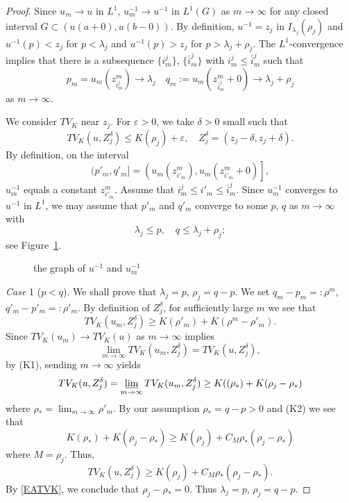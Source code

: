\documentclass[10pt,a4paper]{amsart}
\begin{document}
\begin{proof}
Since $u_m\to u$ in $L^1$, $u_m^{-1}\to u^{-1}$ in $L^1(G)$ as $m\to\infty$ for any closed interval $G \subset\left(u(a+0),u(b-0)\right)$.
 By definition, $u^{-1}=z_j$ in $I_{\lambda_j}(\rho_j)$ and $u^{-1}(p)<z_j$ for $p<\lambda_j$ and $u^{-1}(p)>z_j$ for $p>\lambda_j+\rho_j$.
 The $L^1$-convergence implies that there is a subsequence $\{i_m^j\}$, $\{\bar{i}_m^j\}$ with $i_m^j\le \bar{i}_m^j$ such that
\[
    p_m = u_m(z_{i_m^j}^m) \to \lambda_j \quad
    q_m := u_m(z_{\bar{i}_m^j}^m + 0) \to \lambda_j + \rho_j
\]
as $m\to\infty$.

We consider $TV_K$ near $z_j$.
 For $\varepsilon>0$, we take $\delta>0$ small such that
\begin{equation} \label{EATVK}
    TV_K(u,Z_j^\delta) \le K(\rho_j) + \varepsilon, \quad
    Z_j^\delta = (z_j-\delta, z_j+\delta).
\end{equation}
By definition, on the interval
\[
    (p'_m, q'_m]
    = \left( u_m(z_{i'_m}^m), u_m(z_{i'_m}^m + 0) \right],
\]
$u_m^{-1}$ equals a constant $z_{i'_m}^m$.
 Assume that $i_m^j\le i'_m\le \bar{i}_m^j$.
 Since $u_m^{-1}$ converges to $u^{-1}$ in $L^1$,
 we may assume that $p'_m$ and $q'_m$ converge to some $p$, $q$ as $m\to\infty$ with
\[
    \lambda_j \le p, \quad
    q \le \lambda_j + \rho_j;
\]
see Figure~\ref{FAp}.
\begin{figure}[tb]
\centering 

\caption{the graph of $u^{-1}$ and $u_m^{-1}$\label{FAp}}
\end{figure}

\noindent
\emph{Case} 1 ($p<q$).
 We shall prove that $\lambda_j=p$, $\rho_j=q-p$.
 We set $q_m-p_m=:\rho^m$, $q'_m-p'_m=:\rho'_m$.
 By definition of $Z_j^\delta$, for sufficiently large $m$ we see that
\[
    TV_K(u_m,Z_j^\delta) \ge K(\rho'_m)
    + K(\rho^m -\rho'_m).
\]
Since $TV_K(u_m)\to TV_K(u)$ as $m\to\infty$ implies
\[
    \lim_{m\to\infty} TV_K (u_m,Z_j^\delta)
    = TV_K (u,Z_j^\delta),
\]
by (K1), sending $m\to\infty$ yields
\[
    TV_K(u,Z_j^\delta)
    = \varliminf_{m\to\infty} TV_K(u_m,Z_j^\delta)
    \ge K((\rho_*) + K(\rho_j-\rho_*)
\]
where $\rho_*=\lim_{m\to\infty}\rho'_m$.
 By our assumption $\rho_*=q-p>0$ and (K2) we see that
\[
    K(\rho_*) + K(\rho_j-\rho_*)
    \ge K(\rho_j) + C_M \rho_*(\rho_j-\rho_*)
\]
where $M=\rho_j$.
 Thus,
\[
    TV_K(u,Z_j^\delta) \ge K(\rho_j)
    + C_M \rho_*(\rho_j-\rho_*).
\]
By \eqref{EATVK}, we conclude that $\rho_j-\rho_*=0$.
 Thus $\lambda_j=p$, $\rho_j=q-p$.


\end{proof}
\end{document}
